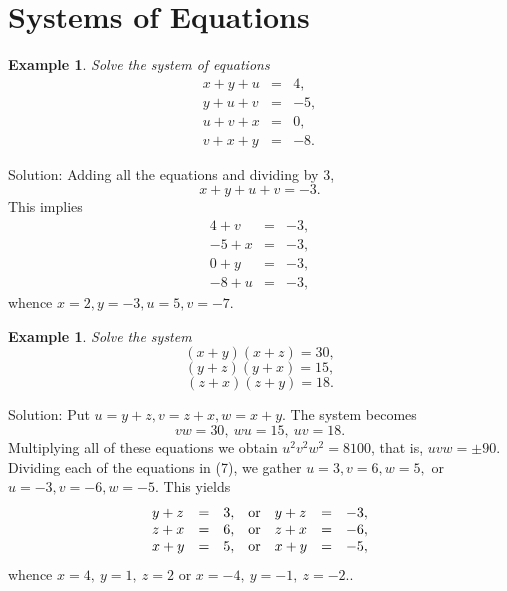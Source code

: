 \documentclass[11pt, openany]{book}
\theoremstyle{change} \theoremheaderfont{\blue\sffamily\bfseries}
\newtheorem{exa}[thm]{Example}
\theoremstyle{nonumberplain} \theoremheaderfont{\sffamily\bfseries}
\newcommand{\í}{\'{\i}}
\begin{document}
\section{Systems of Equations}
\begin{exa} Solve the system of equations
$$ \begin{array}{ccc}
x + y + u & = & 4, \\
y +  u + v & = & -5, \\
u + v + x & = & 0,\\
v + x + y & = & -8. \end{array}$$ \end{exa} Solution: Adding all
the equations and dividing by 3,
$$x + y + u + v = -3.$$This implies
$$ \begin{array}{ccc}
4 + v & = & -3, \\
-5 + x & = & -3, \\
0 + y & = & -3,\\
-8 + u & = & -3, \end{array}$$ whence $x = 2, y = -3, u = 5, v =
-7.$
\begin{exa} Solve the system
$$(x + y)(x + z) = 30,$$
$$(y + z)(y + x) = 15,$$
$$(z + x)(z + y) = 18.$$
\end{exa}
Solution: Put $u = y + z, v = z + x, w = x + y.$ The system
becomes
\begin{equation}vw = 30,\  wu = 15,\  uv = 18. \end{equation}
Multiplying all of these equations we obtain $u^2v^2w^2 = 8100$,
that is, $uvw = \pm 90.$ Dividing each of the equations in  (7),
we gather $u = 3, v = 6, w = 5,$ or $u = -3, v = -6, w = - 5.$
This yields
$$\begin{array}{lllllll}
y + z & = & 3, & {\rm or} & y + z & = &  -3, \\
z + x & = & 6, & {\rm or}  & z + x & = & -6, \\
x + y & = & 5, &    {\rm or}      & x + y & = & - 5, \\
\end{array}$$
whence $x = 4,\ y = 1, \ z = 2$ or $x = -4,\ y = -1,\ z = -2.$.
\end{document}
